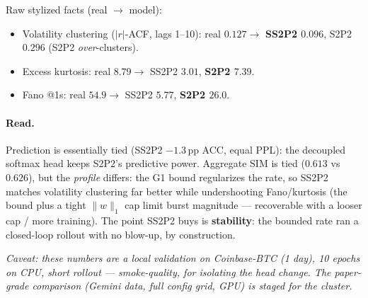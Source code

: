 \documentclass[11pt]{article}
\begin{document}
\noindent Raw stylized facts (real $\to$ model):
\begin{itemize}[leftmargin=1.4em,itemsep=1pt]
\item Volatility clustering ($|r|$-ACF, lags 1--10): real $0.127\to$ \textbf{SS2P2 $0.096$}, S2P2 $0.296$ (S2P2 \emph{over}-clusters).
\item Excess kurtosis: real $8.79\to$ SS2P2 $3.01$, \textbf{S2P2 $7.39$}.
\item Fano @1s: real $54.9\to$ SS2P2 $5.77$, \textbf{S2P2 $26.0$}.
\end{itemize}

\paragraph{Read.} Prediction is essentially tied (SS2P2 $-1.3$\,pp ACC, equal PPL): the
decoupled softmax head keeps S2P2's predictive power. Aggregate SIM is tied
($0.613$ vs $0.626$), but the \emph{profile} differs: the G1 bound regularizes the rate, so
SS2P2 matches volatility clustering far better while undershooting Fano/kurtosis (the bound
plus a tight $\|w\|_1$ cap limit burst magnitude — recoverable with a looser cap / more
training). The point SS2P2 buys is \textbf{stability}: the bounded rate ran a closed-loop
rollout with no blow-up, by construction.

\vspace{0.4em}
\noindent\footnotesize\textit{Caveat: these numbers are a local validation on Coinbase-BTC
(1 day), 10 epochs on CPU, short rollout — smoke-quality, for isolating the head change. The
paper-grade comparison (Gemini data, full config grid, GPU) is staged for the cluster.}
\end{document}
